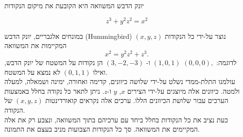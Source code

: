 \begin{surferPage}{יונק הדבש}
המשוואה היא הקובעת את מיקום הנקודות
  
  \smallskip
\[z^3+ y^2	z^2	= x^2\]

\singlespacing
במונחים אלגבריים, יונק הדבש (Hummingbird) נוצר על-ידי כל הנקודות $(x, y, z)$ המקיימות את המשוואה
\smallskip
\[ x^2= y^2z^2+z^3.\]
\smallskip
לדוגמה: $(0,0,0),$ $(1,0,1)$ ו- $(3,-2,-3)$ הן נקודות על המשטח של יונק הדבש, ואילו $(0,1,1)$ לא נמצא על המשטח.\\
 \singlespacing
 עולמנו התלת-ממדי נשלט על-ידי שלושה כיוונים, קדימה ואחורה, ימינה ושמאלה, למעלה ולמטה. כיוונים אלה מיוצגים על-ידי הצירים $x$, $y$ ו-$z$. ניתן לתאר כל נקודה בחלל באמצעות הערכים עבור שלושת הכיוונים הללו. ערכים אלה נקראים קואורדינטות $(x,y,z)$ של הנקודה.\\
\singlespacing
כעת נציב את כל הנקודות בחלל ביחד עם ערכיהם בתוך המשוואה, ונצבע רק את אלה המקיימים את המשוואה. סך כל הנקודות הצבועות מניב בעצם את התמונה.
\end{surferPage}
